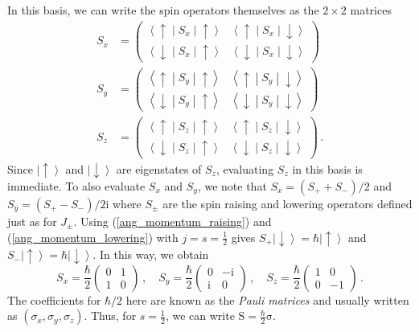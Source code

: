 \documentclass{article}
\theoremstyle{plain}\theoremheaderfont{\normalfont\itshape}\theorembodyfont{\rmfamily}\theoremseparator{.}\newtheorem*{rem}{Remark}\newtheorem*{ex}{Example}\newtheorem*{proof}{Proof}\newtheorem*{altp}{Alternative proof}
\theoremstyle{plain}\theoremheaderfont{\normalfont\bfseries}\theorembodyfont{\rmfamily}\theoremseparator{.}\newtheorem{thm}{Theorem}[section]\newtheorem{lem}[thm]{Lemma}\newtheorem{prop}[thm]{Proposition}\newtheorem*{cor}{Corollary}\newtheorem{defn}[thm]{Definition}\newtheorem{clm}[thm]{Claim}\newtheorem{clminproof}{Claim}
\theoremstyle{break}\theoremheaderfont{\normalfont\itshape}\theorembodyfont{\rmfamily}\theoremseparator{.\medskip}\newtheorem*{proofskip}{Proof}\newtheorem*{exs}{Examples}\newtheorem*{rems}{Remarks}
\theoremstyle{break}\theoremheaderfont{\normalfont\bfseries}\theorembodyfont{\rmfamily}\theoremseparator{.\medskip}\newtheorem{lemskip}[thm]{Lemma}\newtheorem{defnskip}[thm]{Definition}\newtheorem{propskip}[thm]{Proposition}\newtheorem{thmskip}[thm]{Theorem}
\numberwithin{equation}{section}
\newcommand{\ii}{\mathrm{i}}
\newcommand{\ket}[1]{\left| #1 \right\rangle}
\newcommand{\mel}[3]{\left\langle #1 \middle| #2 \middle| #3 \right\rangle}
\newcommand{\vb}[1]{\bm{\mathrm{#1}}}
\begin{document}
    In this basis, we can write the spin operators themselves as the \(2\times 2\) matrices
    \begin{align}
        S_{x}&=\begin{pmatrix}
            \mel{\uparrow}{S_x}{\uparrow} & \mel{\uparrow}{S_x}{\downarrow} \\
            \mel{\downarrow}{S_x}{\uparrow} & \mel{\downarrow}{S_x}{\downarrow}
        \end{pmatrix}\\
        S_y&=\begin{pmatrix}
            \mel{\uparrow}{S_y}{\uparrow} & \mel{\uparrow}{S_y}{\downarrow} \\
            \mel{\downarrow}{S_y}{\uparrow} & \mel{\downarrow}{S_y}{\downarrow}
        \end{pmatrix}\\
        S_z&=\begin{pmatrix}
            \mel{\uparrow}{S_z}{\uparrow} & \mel{\uparrow}{S_z}{\downarrow} \\
            \mel{\downarrow}{S_z}{\uparrow} & \mel{\downarrow}{S_z}{\downarrow}
        \end{pmatrix}\,.
    \end{align}
    Since \(\ket{\uparrow}\) and \(\ket{\downarrow}\) are eigenstates of \(S_z\), evaluating \(S_z\) in this basis is immediate. To also evaluate \(S_x\) and \(S_y\), we note that \(S_x=(S_+ + S_-)/2\) and \(S_y=(S_+ - S_-)/2\ii\) where \(S_\pm\) are the spin raising and lowering operators defined just as for \(J_\pm\). Using (\ref{ang_momentum_raising}) and (\ref{ang_momentum_lowering}) with \(j=s=\frac{1}{2}\) gives \(S_+\ket{\downarrow}=\hbar\ket{\uparrow}\) and \(S_-\ket{\uparrow}=\hbar\ket{\downarrow}\). In this way, we obtain
    \begin{equation}
        S_x=\frac{\hbar}{2}\begin{pmatrix}
            0 & 1 \\ 1 & 0
        \end{pmatrix}\,,\quad S_y=\frac{\hbar}{2}\begin{pmatrix}
            0 & -\ii \\ \ii & 0
        \end{pmatrix}\,,\quad S_z=\frac{\hbar}{2}\begin{pmatrix}
            1 & 0 \\ 0 & -1
        \end{pmatrix}\,.
    \end{equation}
    The coefficients for \(\hbar/2\) here are known as the \textit{Pauli matrices} and usually written as \((\sigma_x,\sigma_y,\sigma_z)\). Thus, for \(s=\frac{1}{2}\), we can write \(\vb{S}=\frac{\hbar}{2}\vb{\sigma}\).
\end{document}
